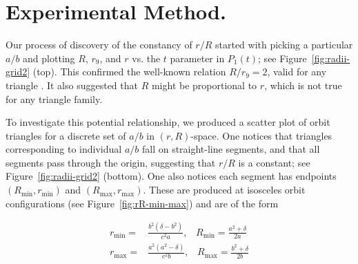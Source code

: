 \documentclass{amsart}
\theoremstyle{definition}
\begin{document}
\section{Experimental Method.}
\label{sec:experimental}
Our process of discovery of the constancy of $r/R$ started with picking a particular $a/b$ and plotting $R$, $r_9$, and $r$ vs. the $t$ parameter in $P_1(t)$; see Figure~\ref{fig:radii-grid2} (top). This confirmed the well-known relation $R/r_9=2$, valid for any triangle \cite{coxeter67}. It also suggested  that $R$ might be proportional to $r$, which is not true for any triangle family.

To investigate this potential relationship, we produced a scatter plot of orbit triangles for a discrete set of $a/b$ in $(r,R)$-space. One notices that triangles corresponding to individual $a/b$ fall on straight-line segments, and that all segments pass through the origin, suggesting that $r/R$ is a constant; see Figure~\ref{fig:radii-grid2} (bottom). One also notices each segment has endpoints $(R_\text{min},r_\text{min})$ and $(R_\text{max},r_\text{max})$. These are produced at isosceles orbit configurations (see Figure~\ref{fig:rR-min-max}) and are of the form

\begin{align}
r_{\mathrm{min}}=&  \frac{b^2(\delta - b^2)}{c^2 a},\;\;\;R_{\mathrm{min}}= \frac{a^2+\delta}{2a} \nonumber \\
r_{\mathrm{max}}=&  \frac{a^2(a^2 - \delta)}{c^2 b},\;\;\;R_{\mathrm{max}}= \frac{b^2+\delta}{2b}
\label{eqn:rmin-rmax}
\end{align}
\end{document}
